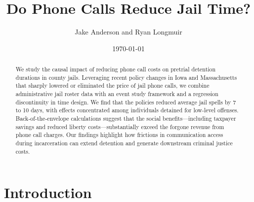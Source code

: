 \documentclass[12pt, a4paper]{article}
\title{Do Phone Calls Reduce Jail Time?}
\author{Jake Anderson and Ryan Longmuir}
\date{\today}
\begin{document}
\maketitle


\begin{abstract}
We study the causal impact of reducing phone call costs on pretrial detention durations in county jails. Leveraging recent policy changes in Iowa and Massachusetts that sharply lowered or eliminated the price of jail phone calls, we combine administrative jail roster data with an event study framework and a regression discontinuity in time design. We find that the policies reduced average jail spells by 7 to 10 days, with effects concentrated among individuals detained for low-level offenses. Back-of-the-envelope calculations suggest that the social benefits—including taxpayer savings and reduced liberty costs—substantially exceed the forgone revenue from phone call charges. Our findings highlight how frictions in communication access during incarceration can extend detention and generate downstream criminal justice costs.
\end{abstract}

\newpage
\section{Introduction}





\end{document}
